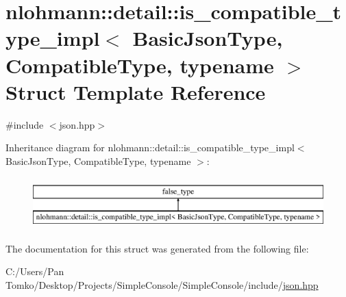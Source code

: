 \hypertarget{structnlohmann_1_1detail_1_1is__compatible__type__impl}{}\section{nlohmann\+::detail\+::is\+\_\+compatible\+\_\+type\+\_\+impl$<$ Basic\+Json\+Type, Compatible\+Type, typename $>$ Struct Template Reference}
\label{structnlohmann_1_1detail_1_1is__compatible__type__impl}


{\ttfamily \#include $<$json.\+hpp$>$}

Inheritance diagram for nlohmann\+::detail\+::is\+\_\+compatible\+\_\+type\+\_\+impl$<$ Basic\+Json\+Type, Compatible\+Type, typename $>$\+:\begin{figure}[H]
\begin{center}
\leavevmode
\includegraphics[height=2.000000cm]{d9/d66/structnlohmann_1_1detail_1_1is__compatible__type__impl}
\end{center}
\end{figure}


The documentation for this struct was generated from the following file\+:\begin{DoxyCompactItemize}
\item 
C\+:/\+Users/\+Pan Tomko/\+Desktop/\+Projects/\+Simple\+Console/\+Simple\+Console/include/\mbox{\hyperlink{json_8hpp}{json.\+hpp}}\end{DoxyCompactItemize}
